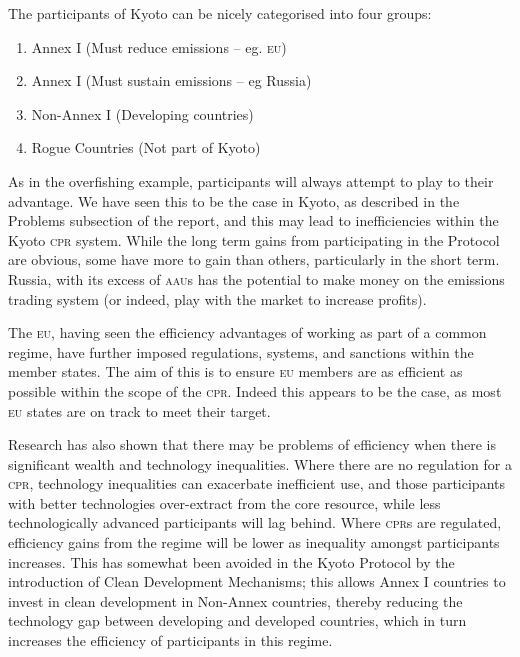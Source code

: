The participants of Kyoto can be nicely categorised into four groups:
\begin{enumerate}
	\item Annex I (Must reduce emissions – eg. \textsc{eu})
	\item Annex I (Must sustain emissions – eg Russia)
	\item Non-Annex I (Developing countries)
	\item Rogue Countries (Not part of Kyoto)
\end{enumerate}

As in the overfishing example, participants will always attempt to play to their advantage. We have seen this to be the case in Kyoto, as described in the Problems subsection of the report, and this may lead to inefficiencies within the Kyoto \textsc{cpr} system. While the long term gains from participating in the Protocol are obvious, some have more to gain than others, particularly in the short term. Russia, with its excess of \textsc{aau}s has the potential to make money on the emissions trading system (or indeed, play with the market to increase profits).

The \textsc{eu}, having seen the efficiency advantages of working as part of a common regime, have further imposed regulations, systems, and sanctions within the member states. The aim of this is to ensure \textsc{eu} members are as efficient as possible within the scope of the \textsc{cpr}. Indeed this appears to be the case, as most \textsc{eu} states are on track to meet their target.~\cite{EEA-Tracking-progress-20}

Research has also shown that there may be problems of efficiency when there is significant wealth and technology inequalities. Where there are no regulation for a \textsc{cpr}, technology inequalities can exacerbate inefficient use, and those participants with better technologies over-extract from the core resource, while less technologically advanced participants will lag behind. Where \textsc{cpr}s are regulated, efficiency gains from  the regime will be lower as inequality amongst participants increases. This has somewhat been avoided in the Kyoto Protocol by the introduction of Clean Development Mechanisms; this allows Annex I countries to invest in clean development in Non-Annex countries, thereby reducing the technology gap between developing and developed countries, which in turn increases the efficiency of participants in this regime.~\cite{Wealth-inequality-regulated}\cite{Wealth-inequality-unregulated}

